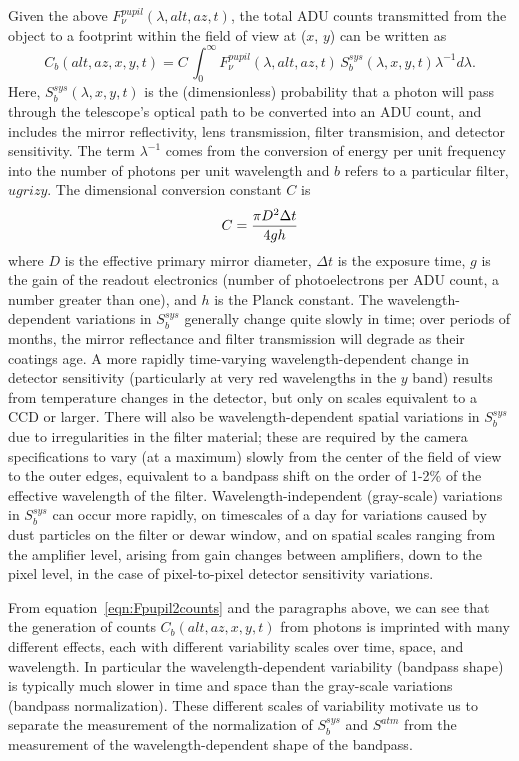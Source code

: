 \documentclass[12pt,preprint]{aastex}
\begin{document}
Given the above $F_\nu^{pupil}(\lambda,alt,az,t)$, the total ADU
counts transmitted from the object to a footprint within the field of
view at ($x$, $y$) can be written as
\begin{equation}
\label{eqn:Fpupil2counts}
    C_b(alt, az, x,y,t) = C \, \int_0^\infty {F_\nu^{pupil}(\lambda,alt,az,t) \, S_b^{sys}(\lambda,x,y,t) \lambda^{-1}d\lambda}.
\end{equation}
Here, $S_b^{sys}(\lambda,x,y,t)$ is the (dimensionless) probability
that a photon will pass through the telescope's optical path to be
converted into an ADU count, and 
includes the mirror reflectivity, lens transmission, filter
transmision, and detector sensitivity. The term
$\lambda^{-1}$ comes from the conversion of energy per unit frequency
into the number of photons per unit wavelength and $b$ refers to a particular filter, $ugrizy$. The
dimensional conversion constant $C$ is
\begin{equation}
\label{eqn:Cconstant}
        C = {\pi D^2 \Delta t \over 4 g h }  
\end{equation}
where $D$ is the effective primary mirror diameter, $\Delta t$ is the
exposure time, $g$ is the gain of the readout electronics (number of
photoelectrons per ADU count, a number greater than one), and $h$ is
the Planck constant. The wavelength-dependent variations in
$S_b^{sys}$ generally change quite slowly in time; over periods of
months, the mirror reflectance and filter transmission will degrade as
their coatings age. A more rapidly time-varying wavelength-dependent
change in detector sensitivity (particularly at very red wavelengths
in the $y$ band) results from temperature changes in the detector, but
only on scales equivalent to a CCD or larger.  There will also be
wavelength-dependent spatial variations in $S_b^{sys}$ due to
irregularities in the filter material; these are required by the
camera specifications to vary (at a maximum)
slowly from the center of the field of view to the outer edges,
equivalent to a bandpass shift on the order of 1-2\% of the effective
wavelength of the filter. Wavelength-independent (gray-scale)
variations in $S_b^{sys}$ can occur more rapidly, on timescales of a
day for variations caused by dust particles on the filter or dewar
window, and on spatial scales ranging from the amplifier level,
arising from gain changes between amplifiers, down to the pixel level,
in the case of pixel-to-pixel detector sensitivity variations.

From equation~\ref{eqn:Fpupil2counts} and the paragraphs above, we can
see that the generation of counts $C_b(alt,az,x,y,t)$ from photons is
imprinted with many different effects, each with different variability
scales over time, space, and wavelength. In particular the
wavelength-dependent variability (bandpass shape) is
typically much slower in time and space than the gray-scale variations
(bandpass normalization). These different scales of variability
motivate us to separate the measurement of the normalization of
$S_b^{sys}$ and $S^{atm}$ from the measurement of the
wavelength-dependent shape of the bandpass.
\end{document}
